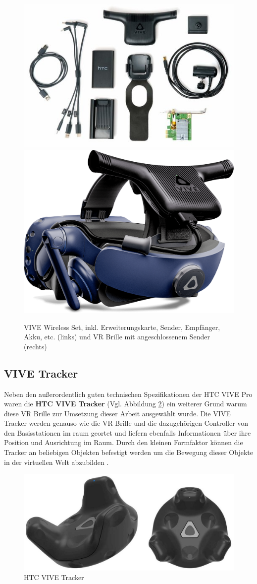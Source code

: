 \begin{figure}[h]
	\centering
	\includegraphics[width=0.5\linewidth]{Bilder/A27_WirelessKit}
	\includegraphics[width=0.4\linewidth]{Bilder/A28_Vive+Wireless}
	\caption{VIVE Wireless Set, inkl. Erweiterungskarte, Sender, Empfänger, Akku, etc. (links) \cite{A27} und VR Brille mit angeschlossenem Sender (rechts) \cite{A28}}
	\label{fig:WirelessKit}
\end{figure}

\subsection{VIVE Tracker}\label{sec:TrackerVive}
Neben den außerordentlich guten technischen Spezifikationen der HTC VIVE Pro waren die \textbf{HTC VIVE Tracker} (Vgl. Abbildung \ref{fig:ViveTracker}) ein weiterer Grund warum diese VR Brille zur Umsetzung dieser Arbeit ausgewählt wurde. Die VIVE Tracker werden genauso wie die VR Brille und die dazugehörigen Controller von den Basisstationen im raum geortet und liefern ebenfalls Informationen über ihre Position und Ausrichtung im Raum. Durch den kleinen Formfaktor können die Tracker an beliebigen Objekten befestigt werden um die Bewegung dieser Objekte in der virtuellen Welt abzubilden \cite{30}.
\newline
\begin{figure}[h]
	\centering
	\includegraphics[width=0.55\linewidth]{Bilder/A29_ViveTracker}
	\caption{HTC VIVE Tracker \cite{A29}}
	\label{fig:ViveTracker}
\end{figure}

